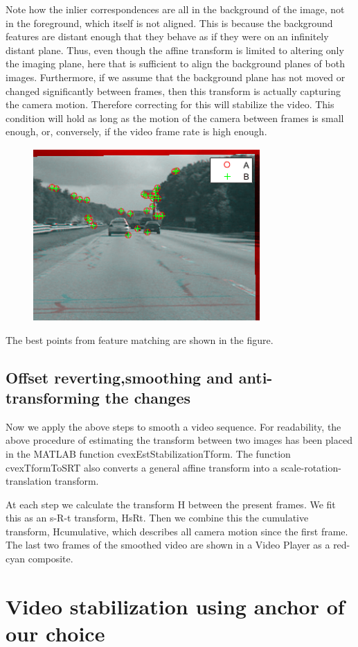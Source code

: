 \documentclass[a4paper]{article}
\begin{document}
	Note how the inlier correspondences are all in the background of the image, not in the foreground, which itself is not aligned. This is because the background features are distant enough that they behave as if they were on an infinitely distant plane. Thus, even though the affine transform is limited to altering only the imaging plane, here that is sufficient to align the background planes of both images. Furthermore, if we assume that the background plane has not moved or changed significantly between frames, then this transform is actually capturing the camera motion. Therefore correcting for this will stabilize the video. This condition will hold as long as the motion of the camera between frames is small enough, or, conversely, if the video frame rate is high enough.
	\begin{figure}[htpb!] 
		\centering 
		\includegraphics{FeatureMatching.png}
	\end{figure}
	The best points from feature matching are shown in the figure.
	\hfill \break
	\subsection{Offset reverting,smoothing and anti-transforming the changes}
	Now we apply the above steps to smooth a video sequence. For readability, the above procedure of estimating the transform between two images has been placed in the MATLAB function cvexEstStabilizationTform. The function cvexTformToSRT also converts a general affine transform into a scale-rotation-translation transform.
	
	At each step we calculate the transform H between the present frames. We fit this as an s-R-t transform, HsRt. Then we combine this the cumulative transform, Hcumulative, which describes all camera motion since the first frame. The last two frames of the smoothed video are shown in a Video Player as a red-cyan composite.
	\section{Video stabilization using anchor of our choice}
	
\end{document}
